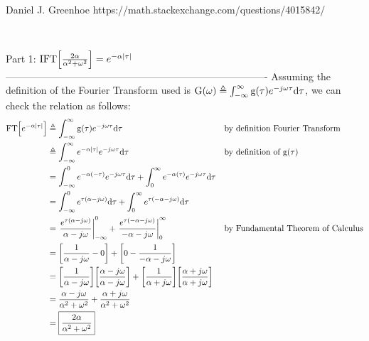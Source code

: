 Daniel J. Greenhoe
https://math.stackexchange.com/questions/4015842/


$\newcommand{\eqd}{\triangleq}$
$\newcommand{\eqa}{\approx}$
$\newcommand{\abs}[1]{{\left\lvert #1 \right\rvert}}$
$\newcommand{\brp}[1]{{\left(#1\right)}}$
$\newcommand{\brs}[1]{{\left[#1\right]}}$
$\newcommand{\brlr}[1]{\left.#1\right|}$
$\newcommand{\deriv} [2]   {{\frac{\mathrm{d}#1}{\mathrm{d}#2} }}$
$\newcommand{\R}{\Bbb{R}}$
$\newcommand{\intcc} [2]  {{\left[#1:#2\right]}}$
$\newcommand{\intoo} [2]  {{\left(#1:#2\right)}}$
$\newcommand{\intoc} [2]  {{\left(#1:#2\right]}}$
$\newcommand{\intco} [2]  {{\left[#1:#2\right)}}$
$\newcommand{\ff}{\mathrm{f}}$
$\newcommand{\fF}{\mathrm{F}}$
$\newcommand{\fG}{\mathrm{G}}$
$\newcommand{\fg}{\mathrm{g}}$
$\newcommand{\fphi}{\mathrm{\phi}}$
$\newcommand{\dx}{\mathrm{dx}}$
$\newcommand{\dtau}{\mathrm{d\tau}}$
$\newcommand{\du}{\mathrm{du}}$
$\newcommand{\dv}{\mathrm{dv}}$
$\newcommand{\ds}{\displaystyle}$
$\newcommand{\thme}[1]{#1}$
$\newcommand{\opFT}{\mathrm{FT}}$
$\newcommand{\opIFT}{\mathrm{IFT}}$
$\newcommand{\thme}[1]{#1}$

Part 1: $\opIFT\brs{\frac{2\alpha}{\alpha^2+\omega^2}} = e^{-\alpha\abs{\tau}}$
-------------------------------------------------------------------------------
Assuming the definition of the Fourier Transform used is
$\fG(\omega)\eqd \int_{-\infty}^{\infty}\fg(\tau)e^{-j\omega\tau}\dtau$,
we can check the relation as follows:
\begin{align}
  \opFT\brs{e^{-\alpha\abs{\tau}}}
    &\eqd \int_{-\infty}^{\infty}\fg(\tau)e^{-j\omega\tau}\dtau
    && \text{by definition Fourier Transform}
  \\&\eqd \int_{-\infty}^{\infty} e^{-\alpha\abs{\tau}} e^{-j\omega\tau}\dtau
    && \text{by definition of $\fg(\tau)$}
  \\&= \int_{-\infty}^{0} e^{-\alpha(-\tau)} e^{-j\omega\tau}\dtau
     + \int_{0}^{\infty} e^{-\alpha(\tau)} e^{-j\omega\tau}\dtau
  \\&= \int_{-\infty}^{0} e^{\tau(\alpha-j\omega)}\dtau
     + \int_{0}^{\infty} e^{\tau(-\alpha-j\omega)}\dtau
  \\&= \brlr{\frac{e^{\tau(\alpha-j\omega)}}{\alpha-j\omega}}_{-\infty}^{0}
     + \brlr{\frac{e^{\tau(-\alpha-j\omega)}}{-\alpha-j\omega}}_{0}^{\infty}
    && \text{by Fundamental Theorem of Calculus}
  \\&= \brs{\frac{1}{\alpha-j\omega} - 0}
     + \brs{0- \frac{1}{-\alpha-j\omega}}
  \\&= \brs{\frac{1}{\alpha-j\omega}}\brs{\frac{\alpha-j\omega}{\alpha-j\omega}}
     + \brs{\frac{1}{\alpha+j\omega}}\brs{\frac{\alpha+j\omega}{\alpha+j\omega}}
  \\&= \frac{\alpha-j\omega}{\alpha^2+\omega^2}
     + \frac{\alpha+j\omega}{\alpha^2+\omega^2}
  \\&= \boxed{\frac{2\alpha}{\alpha^2+\omega^2}}
\end{align}

